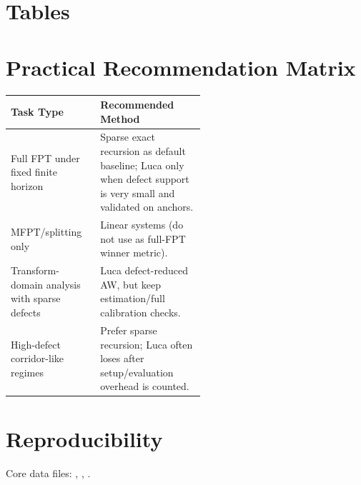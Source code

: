 \documentclass[11pt]{article}
\begin{document}
\section{Tables}
\begin{table}[H]
\centering
\small
\caption{Runtime ratio summary by defect bin and horizon.}
\resizebox{\linewidth}{!}{}
\end{table}
\begin{table}[H]
\centering
\small
\caption{Anchor workload runtime baselines.}
\resizebox{\linewidth}{!}{}
\end{table}
\section{Practical Recommendation Matrix}
\begin{table}[H]
\centering
\small
\begin{tabular}{@{}l>{\raggedright\arraybackslash}p{0.54\linewidth}@{}}
\toprule
Task Type & Recommended Method \\
\midrule
Full FPT under fixed finite horizon & Sparse exact recursion as default baseline; Luca only when defect support is very small and validated on anchors. \\
MFPT/splitting only & Linear systems (do not use as full-FPT winner metric). \\
Transform-domain analysis with sparse defects & Luca defect-reduced AW, but keep estimation/full calibration checks. \\
High-defect corridor-like regimes & Prefer sparse recursion; Luca often loses after setup/evaluation overhead is counted. \\
\bottomrule
\end{tabular}
\end{table}
\section{Reproducibility}
Core data files: , , .
\end{document}
